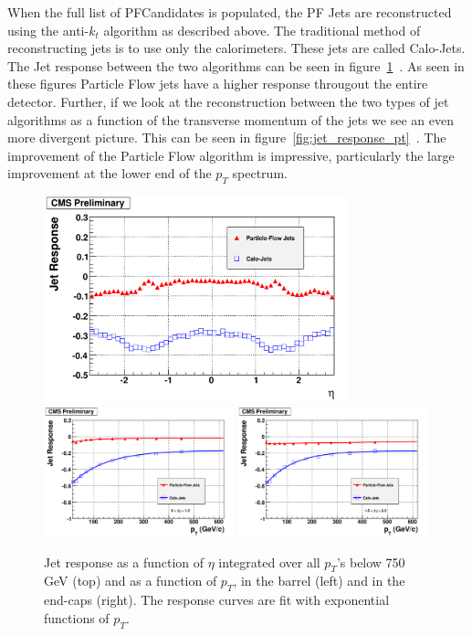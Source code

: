 When the full list of PFCandidates is populated, the PF Jets are reconstructed using the anti-$k_t$ algorithm as described above.  The traditional method of reconstructing jets is to use only the calorimeters.  These jets are called Calo-Jets.  The Jet response between the two algorithms can be seen in figure~\ref{fig:jet_response}~\cite{particleflow}. As seen in these figures Particle Flow jets have a higher response througout the entire detector.  Further, if we look at the reconstruction between the two types of jet algorithms as a function of the transverse momentum of the jets we see an even more divergent picture.  This can be seen in figure~\ref{fig:jet_response_pt}~\cite{particleflow}. The improvement of the Particle Flow algorithm is impressive, particularly the large improvement at the lower end of the $p_T$ spectrum.

\begin{figure}
\begin{center}
\includegraphics[width=0.79\textwidth]{Reconstruction/Figure_008-a-rotated90.pdf}\\
\includegraphics[width=0.49\textwidth]{Reconstruction/Figure_008-b-rotated90.pdf}
\includegraphics[width=0.49\textwidth]{Reconstruction/Figure_008-c-rotated90.pdf}
\caption{Jet response as a function of $\eta$ integrated over all $p_T$'s below 750 GeV (top) and as a function of $p_T$, in the barrel (left) and in the end-caps (right). The response curves are fit with exponential functions of $p_T$.~\cite{particleflow}}
\label{fig:jet_response}
\end{center}
\end{figure}


